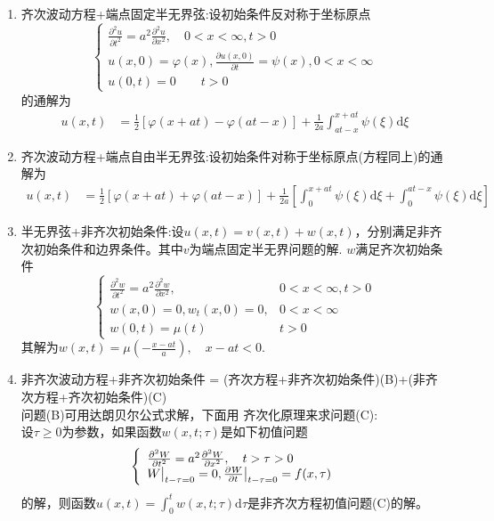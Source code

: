 \documentclass[UTF8,9pt]{ctexart}
\renewcommand{\r}[1]{{\color{red} #1}}
\begin{document}
\begin{enumerate}
\item 齐次波动方程+端点固定半无界弦:设初始条件反对称于坐标原点$$ 
\left\{\begin{array}{l}{\frac{\partial^{2} u}{\partial t^{2}}=a^{2} \frac{\partial^{2} u}{\partial x^{2}}, \quad 0<x<\infty, t>0} \\ {u(x, 0)=\varphi(x), \frac{\partial u(x, 0)}{\partial t}=\psi(x), 0<x<\infty} \\ {u(0, t)=0 \quad \quad t>0}\end{array}\right.
$$
的通解为$$ 
\begin{aligned} u(x, t) &=\frac{1}{2}[\varphi(x+a t)-\varphi(a t-x)]+\frac{1}{2 a} \int_{a t-x}^{x+a t} \psi(\xi) \mathrm{d} \xi \end{aligned}
$$
\item 齐次波动方程+端点自由半无界弦:设初始条件对称于坐标原点(方程同上)的通解为
$$ 
\begin{aligned} u(x, t) &=\frac{1}{2}[\varphi(x+a t)+\varphi(a t-x)]+\frac{1}{2 a}\left[\int_{0}^{x+a t} \psi(\xi) \mathrm{d} \xi+\int_{0}^{a t-x} \psi(\xi) \mathrm{d} \xi\right] \end{aligned}
$$
\item 半无界弦+非齐次初始条件:设$u(x, t)=v(x, t)+w(x, t)$，分别满足非齐次初始条件和边界条件。其中$v$为端点固定半无界问题的解. $w$满足齐次初始条件
$$\left\{\begin{array}{ll}
{\frac{\partial^{2} w}{\partial t^{2}}=a^{2} \frac{\partial^{2} w}{\partial x^{2}},} & {0<x<\infty, t>0} \\ 
{w(x, 0)=0, w_{t}(x, 0)=0,} & {0<x<\infty} \\ {w(0, t)=\mu(t)} & {t>0}
\end{array}\right.$$
其解为$w(x, t)=\mu\left(-\frac{x-a t}{a}\right), \quad x-a t<0$.
\item 非齐次波动方程+非齐次初始条件 = (齐次方程+非齐次初始条件)(B)+(非齐次方程+齐次初始条件)(C)\\
问题(B)可用达朗贝尔公式求解，下面用\r{齐次化原理}来求问题(C):\\
设$\tau\geq0$为参数，如果函数$w(x,t;\tau)$是如下初值问题$$ 
\left\{\begin{array}{l}
\frac{\partial^{2} W}{\partial t^{2}}=a^{2} \frac{\partial^{2} W}{\partial x^{2}}, \quad t>\tau>0 \\ 
W\big|_{t-\tau=0}=0, \frac{\partial^{} W}{\partial t^{}}\big|_{t-\tau=0}=f(x, \tau)
\end{array}\right.
$$的解，则函数$u(x, t)=\int_{0}^{t} w(x, t ; \tau) \mathrm{d} \tau$是非齐次方程初值问题(C)的解。\\

\end{enumerate}
\end{document}
